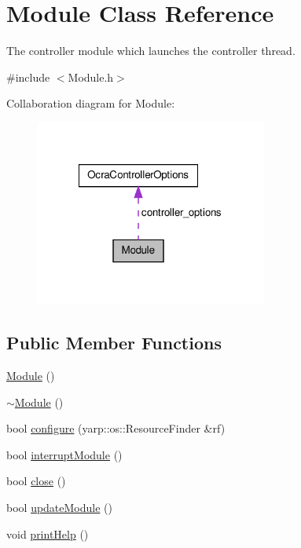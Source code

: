 \hypertarget{classModule}{\section{\-Module \-Class \-Reference}
\label{classModule}
}


\-The controller module which launches the controller thread.  




{\ttfamily \#include $<$\-Module.\-h$>$}



\-Collaboration diagram for \-Module\-:
\nopagebreak
\begin{figure}[H]
\begin{center}
\leavevmode
\includegraphics[width=216pt]{classModule__coll__graph}
\end{center}
\end{figure}
\subsection*{\-Public \-Member \-Functions}
\begin{DoxyCompactItemize}
\item 
\hyperlink{classModule_a5a240a8a9ab1813b17bcb810b24ceaea}{\-Module} ()
\item 
\hyperlink{classModule_a7c9d9c096786d127590fdd8aa2b7d681}{$\sim$\-Module} ()
\item 
bool \hyperlink{classModule_a1f18c762538086e1304ea18e00e51abb}{configure} (yarp\-::os\-::\-Resource\-Finder \&rf)
\item 
bool \hyperlink{classModule_ad53295be6c51e834eec92009c2d7bbf3}{interrupt\-Module} ()
\item 
bool \hyperlink{classModule_ab07583e4393148dfe0fd2ae6e7998a4b}{close} ()
\item 
bool \hyperlink{classModule_a1b1c4963512941537cef766217329a8a}{update\-Module} ()
\item 
void \hyperlink{classModule_a861f70d79b8f36dccf5daae182763bd8}{print\-Help} ()
\end{DoxyCompactItemize}
